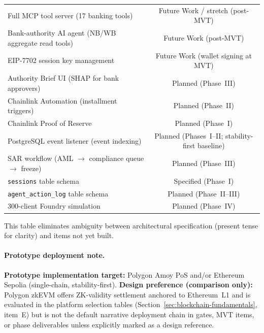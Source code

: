 \documentclass[12pt,a4paper]{report}
\newcommand{\tmarkPartial}{\faHourglassHalf}
\newcommand{\tmarkPlanned}{\textcolor{black!55}{\faCircle}}
\begin{document}
\begin{table}[H]
\begin{tabular}{@{}p{7.5cm}c@{}}
\rowcolor{RowShade}
Full MCP tool server (17 banking tools) & \tmarkPlanned{} Future Work / stretch (post-MVT) \\
Bank-authority AI agent (NB/WB aggregate read tools) & \tmarkPlanned{} Future Work (post-MVT) \\
EIP-7702 session key management & \tmarkPlanned{} Future Work (wallet signing at MVT) \\
Authority Brief UI (SHAP for bank approvers) & \tmarkPlanned{} Planned (Phase~III) \\
\rowcolor{RowShade}
Chainlink Automation (installment triggers) & \tmarkPlanned{} Planned (Phase~II) \\
Chainlink Proof of Reserve & \tmarkPlanned{} Planned (Phase~I) \\
\rowcolor{RowShade}
PostgreSQL event listener (event indexing) & \tmarkPlanned{} Planned (Phases~I--II; stability-first baseline) \\
SAR workflow (AML $\to$ compliance queue $\to$ freeze) & \tmarkPlanned{} Planned (Phase~III) \\
\rowcolor{RowShade}
\texttt{sessions} table schema & \tmarkPartial{} Specified (Phase~I) \\
\texttt{agent\_action\_log} table schema & \tmarkPlanned{} Planned (Phase~II--III) \\
\rowcolor{RowShade}
300-client Foundry simulation & \tmarkPlanned{} Planned (Phase~IV) \\
\bottomrule
\end{tabular}
\end{table}

This table eliminates ambiguity between architectural specification (present tense for clarity) and items not yet built.

\paragraph{Prototype deployment note.}
\textbf{Prototype implementation target:} Polygon Amoy PoS and/or Ethereum Sepolia (single-chain, stability-first). \textbf{Design preference (comparison only):} Polygon zkEVM offers ZK-validity settlement anchored to Ethereum~L1 and is evaluated in the platform selection tables (Section~\ref{sec:blockchain-fundamentals}, item~E) but is not the default narrative deployment chain in gates, MVT items, or phase deliverables unless explicitly marked as a design reference.
\end{document}

